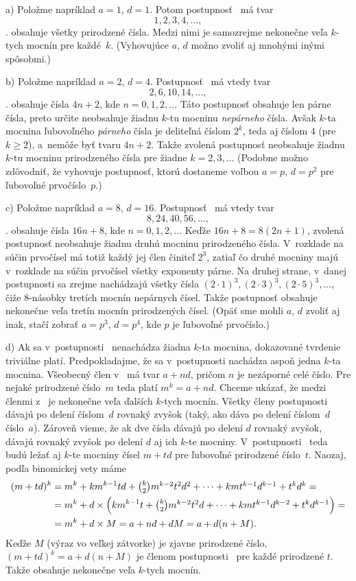 {%
a) Položme napríklad $a=1$, $d=1$. Potom postupnosť~\thetag{$\ast$} má tvar
$$
1,2,3,4,\dots,
$$
\tj. obsahuje všetky prirodzené čísla. Medzi nimi je samozrejme nekonečne veľa $k$-tych mocnín pre každé~$k$. (Vyhovujúce $a$, $d$ možno zvoliť aj mnohými inými spôsobmi.)

\smallskip
b) Položme napríklad $a=2$, $d=4$. Postupnosť~\thetag{$\ast$} má vtedy tvar
$$
2,6,10,14,\dots,
$$
\tj. obsahuje čísla $4n+2$, kde $n=0,1,2,\dots$ Táto postupnosť obsahuje len párne čísla, preto určite neobsahuje žiadnu $k$-tu mocninu {\it nepárneho\/} čísla. Avšak $k$-ta mocnina ľubovoľného {\it párneho\/} čísla je deliteľná číslom $2^k$, teda aj číslom $4$ (pre $k\ge2$), a~nemôže byť tvaru $4n+2$. Takže zvolená postupnosť neobsahuje žiadnu $k$-tu mocninu prirodzeného čísla pre žiadne $k=2,3,\dots$ (Podobne možno zdôvodniť, že vyhovuje postupnosť, ktorú dostaneme voľbou $a=p$, $d=p^2$ pre ľubovoľné prvočíslo~$p$.)

\smallskip
c) Položme napríklad $a=8$, $d=16$. Postupnosť~\thetag{$\ast$} má vtedy tvar
$$
8,24,40,56,\dots,
$$
\tj. obsahuje čísla $16n+8$, kde $n=0,1,2,\dots$ Keďže $16n+8=8(2n+1)$, zvolená postupnosť neobsahuje žiadnu druhú mocninu prirodzeného čísla. V~rozklade na súčin prvočísel má totiž každý jej člen činiteľ $2^3$, zatiaľ čo druhé mocniny majú v~rozklade na súčin prvočísel všetky exponenty párne. Na druhej strane, v~danej postupnosti sa zrejme nachádzajú všetky čísla $(2\cdot1)^3,(2\cdot3)^3,(2\cdot5)^3,\dots$, čiže $8$-násobky tretích mocnín nepárnych čísel. Takže postupnosť obsahuje nekonečne veľa tretín mocnín prirodzených čísel. (Opäť sme mohli $a$, $d$ zvoliť aj inak, stačí zobrať $a=p^3$, $d=p^4$, kde $p$ je ľubovoľné prvočíslo.)

d) Ak sa v~postupnosti~\thetag{$\ast$} nenachádza žiadna $k$-ta mocnina, dokazované tvrdenie triviálne platí. Predpokladajme, že sa v~postupnosti nachádza aspoň jedna $k$-ta mocnina. Všeobecný člen v~\thetag{$\ast$} má tvar $a+nd$, pričom $n$ je nezáporné celé číslo. Pre nejaké prirodzené číslo~$m$ teda platí $m^k=a+nd$. Chceme ukázať, že medzi členmi z~\thetag{$\ast$} je nekonečne veľa ďalších $k$-tych mocnín. Všetky členy postupnosti~\thetag{$\ast$} dávajú po delení číslom~$d$ rovnaký zvyšok (taký, ako dáva po delení číslom~$d$ číslo~$a$). Zároveň vieme, že ak dve čísla dávajú po delení $d$ rovnaký zvyšok, dávajú rovnaký zvyšok po delení $d$ aj ich $k$-te mocniny. V~postupnosti~\thetag{$\ast$} teda budú ležať aj $k$-te mocniny čísel $m+td$ pre ľubovoľné prirodzené číslo~$t$. Naozaj, podľa binomickej vety máme
$$
\aligned
(m+td)^k&=m^k+km^{k-1}td+\textstyle\binom k2m^{k-2}t^2d^2+\cdots+kmt^{k-1}d^{k-1}+t^kd^k=\\
&=m^k+d\cdot\left(km^{k-1}t+\textstyle\binom k2m^{k-2}t^2d+\cdots+kmt^{k-1}d^{k-2}+t^kd^{k-1}\right)=\\
&=m^k+d\cdot M=a+nd+dM=a+d(n+M).
\endaligned
$$
Keďže $M$ (výraz vo veľkej zátvorke) je zjavne prirodzené číslo, $(m+td)^k=a+d(n+M)$ je členom postupnosti~\thetag{$\ast$} pre každé prirodzené $t$. Takže \thetag{$\ast$} obsahuje nekonečne veľa $k$-tych mocnín.

}
